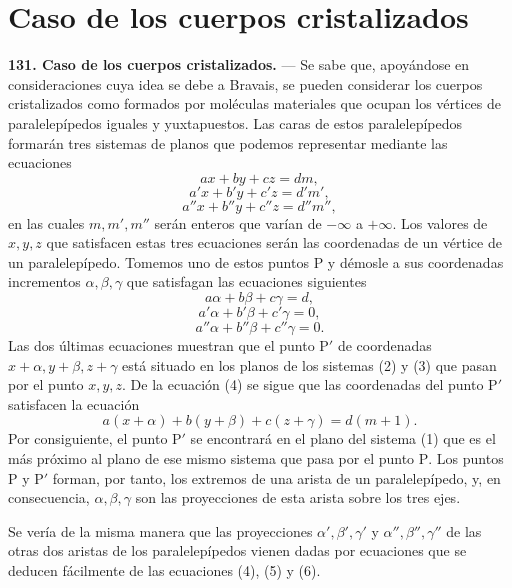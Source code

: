 \section{Caso de los cuerpos cristalizados}

\noindent\textbf{131. Caso de los cuerpos cristalizados.} — Se sabe que,
apoyándose en consideraciones cuya idea se debe a Bravais, se pueden
considerar los cuerpos cristalizados como formados por moléculas
materiales que ocupan los vértices de paralelepípedos iguales y
yuxtapuestos. Las caras de estos paralelepípedos formarán tres sistemas de
planos que podemos representar mediante las ecuaciones
\begin{equation}
ax+by+cz=dm,
\tag{1}
\end{equation}
\begin{equation}
a'x+b'y+c'z=d'm',
\tag{2}
\end{equation}
\begin{equation}
a''x+b''y+c''z=d''m'',
\tag{3}
\end{equation}
en las cuales $m,m',m''$ serán enteros que varían de $-\infty$ a
$+\infty$. Los valores de $x,y,z$ que satisfacen estas tres ecuaciones
serán las coordenadas de un vértice de un paralelepípedo. Tomemos uno de
estos puntos $\mathrm P$ y démosle a sus coordenadas incrementos
$\alpha,\beta,\gamma$ que satisfagan las ecuaciones siguientes
\begin{equation}
a\alpha+b\beta+c\gamma=d,
\tag{4}
\end{equation}
\begin{equation}
a'\alpha+b'\beta+c'\gamma=0,
\tag{5}
\end{equation}
\begin{equation}
a''\alpha+b''\beta+c''\gamma=0.
\tag{6}
\end{equation}
Las dos últimas ecuaciones muestran que el punto $\mathrm P'$ de
coordenadas $x+\alpha,y+\beta,z+\gamma$ está situado en los planos de los
sistemas (2) y (3) que pasan por el punto $x,y,z$. De la ecuación (4) se
sigue que las coordenadas del punto $\mathrm P'$ satisfacen la ecuación
\[
a(x+\alpha)+b(y+\beta)+c(z+\gamma)=d(m+1).
\]
Por consiguiente, el punto $\mathrm P'$ se encontrará en el plano del
sistema (1) que es el más próximo al plano de ese mismo sistema que pasa
por el punto $\mathrm P$. Los puntos $\mathrm P$ y $\mathrm P'$ forman, por
tanto, los extremos de una arista de un paralelepípedo, y, en
consecuencia, $\alpha,\beta,\gamma$ son las proyecciones de esta arista
sobre los tres ejes.

Se vería de la misma manera que las proyecciones $\alpha',\beta',\gamma'$
y $\alpha'',\beta'',\gamma''$ de las otras dos aristas de los
paralelepípedos vienen dadas por ecuaciones que se deducen fácilmente de
las ecuaciones (4), (5) y (6).

